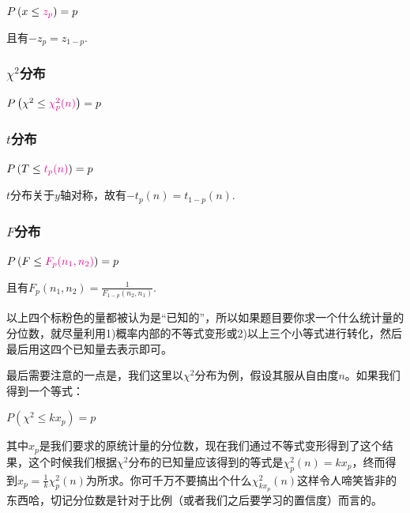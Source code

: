 \documentclass[10pt, a4paper]{article}
\begin{document}
\begin{center}
    $P\left(x \leq {\textcolor{magenta}{z_p}} \right)=p$   
\end{center}\par
且有$-z_p = z_{1-p}$.

\subsubsection*{$\chi^2$分布}

\begin{center}
    $P\left(\chi^2 \leq {\textcolor{magenta}{\chi^2_p (n)}} \right)=p$   
\end{center}\par

\subsubsection*{$t$分布}

\begin{center}
    $P\left(T \leq {\textcolor{magenta}{t_p (n)}} \right)=p$   
\end{center}\par
$t$分布关于$y$轴对称，故有$- t_p (n) = t_{1-p} (n)$.

\subsubsection*{$F$分布}

\begin{center}
    $P\left(F\leq {\textcolor{magenta}{F_p (n_1, n_2)}} \right)=p$   
\end{center}\par
且有$F_p (n_1, n_2) = \frac{1}{F_{1-p} (n_2, n_1)}$.\\\par

以上四个标粉色的量都被认为是“已知的”，所以如果题目要你求一个什么统计量的分位数，就尽量利用1)概率内部的不等式变形或2)以上三个小等式进行转化，然后最后用这四个已知量去表示即可。\par
最后需要注意的一点是，我们这里以$\chi^2$分布为例，假设其服从自由度$n$。如果我们得到一个等式：
\begin{center}
    $P\left(\chi^2 \leq k x_p \right)=p$   
\end{center}\par
其中$x_p$是我们要求的原统计量的分位数，现在我们通过不等式变形得到了这个结果，这个时候我们根据$\chi^2$分布的已知量应该得到的等式是$\chi^2_p (n) = k x_p$，终而得到$x_p = \frac{1}{k} \chi^2_p (n)$为所求。你可千万不要搞出个什么$\chi^2_{k x_p} (n)$这样令人啼笑皆非的东西哈，切记分位数是针对于比例（或者我们之后要学习的置信度）而言的。
\end{document}
